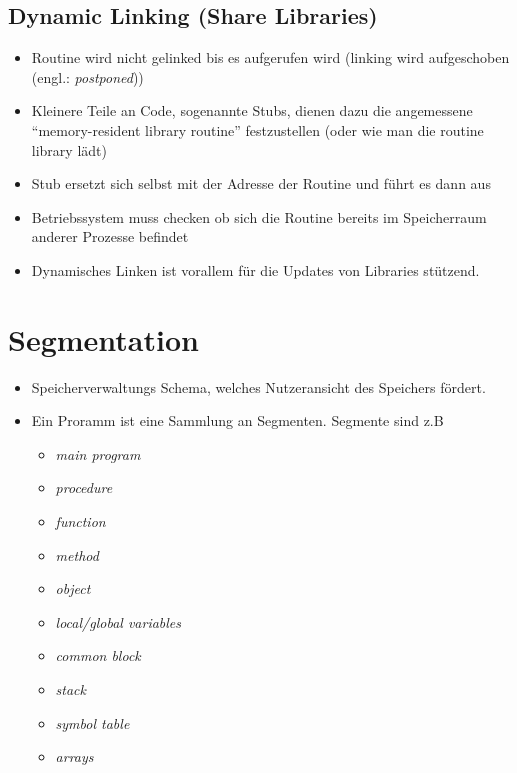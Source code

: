 \documentclass[a4paper]{scrreprt}
\begin{document}
\subsection{Dynamic Linking (Share Libraries)}
\begin{itemize}
\item Routine wird nicht gelinked bis es aufgerufen wird (linking wird aufgeschoben (engl.: \textit{postponed}))
\item Kleinere Teile an Code, sogenannte Stubs, dienen dazu die angemessene "`memory-resident library routine"' festzustellen (oder wie man die routine library lädt)
\item Stub ersetzt sich selbst mit der Adresse der Routine und führt es dann aus
\item Betriebssystem muss checken ob sich die Routine  bereits im Speicherraum anderer Prozesse befindet
\item Dynamisches Linken ist vorallem für die Updates von Libraries stützend.
\end{itemize}

\section{Segmentation}
\begin{itemize}
\item Speicherverwaltungs Schema, welches Nutzeransicht des Speichers fördert.
\item Ein Proramm ist eine Sammlung an Segmenten. Segmente sind z.B
\begin{itemize}
\item \textit{main program}
\item \textit{procedure}
\item \textit{function}
\item \textit{method}
\item \textit{object}
\item \textit{local/global variables}
\item \textit{common block}
\item \textit{stack}
\item \textit{symbol table}
\item \textit{arrays}

\end{itemize}
\end{itemize}
\end{document}
